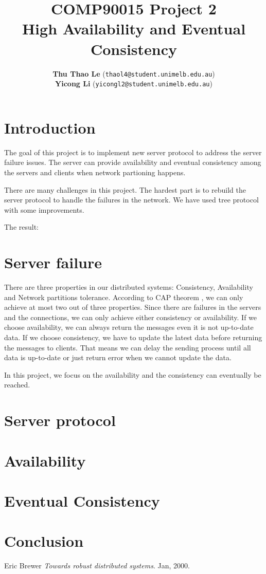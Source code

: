 \documentclass[10pt,twocolumn]{article}
\title{\textbf{COMP90015 Project 2 \\ High Availability and Eventual Consistency\\}}
\author{\textbf{Thu Thao Le} (\texttt{thaol4@student.unimelb.edu.au})
\\[2ex] \textbf{Yicong Li} (\texttt{yicongl2@student.unimelb.edu.au})}
\date{}
\begin{document}
\maketitle

\section{Introduction}
The goal of this project is to implement new server protocol to address the server failure issues. The server can provide availability and eventual consistency among the servers and clients when network partioning happens. 

There are many challenges in this project. The hardest part is to rebuild the server protocol to handle the failures in the network. We have used tree protocol with some improvements.

The result:

\section{Server failure}
There are three properties in our distributed systems: Consistency, Availability and Network partitions tolerance. According to CAP theorem \cite{eric}, we can only achieve at most two out of three properties. Since there are failures in the servers and the connections, we can only achieve either consistency or availability. If we choose availability, we can always return the messages even it is not up-to-date data. If we choose consistency, we have to update the latest data before returning the messages to clients. That means we can delay the sending process until all data is up-to-date or just return error when we cannot update the data. 

In this project, we focus on the availability and the consistency can eventually be reached. 

\section{Server protocol}

\section{Availability}

\section{Eventual Consistency}

\section{Conclusion}

\begin{thebibliography}{9}
Eric Brewer
\textit{Towards robust distributed systems}. Jan, 2000.
\end{thebibliography}
\end{document}
